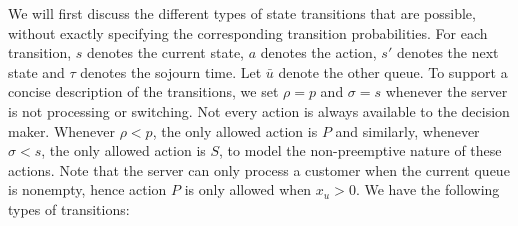 \documentclass{article}
\theoremstyle{definition}
\theoremstyle{plain}
\begin{document}
We will first discuss the different types of state transitions that are
possible, without exactly specifying the corresponding transition probabilities.
For each transition, $s$ denotes the current state, $a$ denotes the action, $s'$
denotes the next state and $\tau$ denotes the sojourn time. Let $\bar{u}$ denote
the other queue. To support a concise description of the transitions, we set
$\rho=p$ and $\sigma=s$ whenever the server is not processing or switching. Not every
action is always available to the decision maker. Whenever $\rho < p$, the only
allowed action is $P$ and similarly, whenever $\sigma < s$, the only allowed action
is $S$, to model the non-preemptive nature of these actions. Note that the
server can only process a customer when the current queue is nonempty, hence
action $P$ is only allowed when $x_{u} > 0$. We have the following types of
transitions:
%
\end{document}

